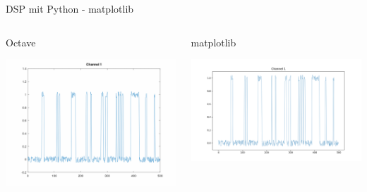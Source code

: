 \documentclass[8pt]{beamer}
\begin{document}
\begin{frame}[label={sec:org7b52c9d}]{DSP mit Python - matplotlib}
\begin{columns}
\begin{column}{0.5\columnwidth}
\begin{block}{Octave}
\begin{center}
\includegraphics[width=.9\linewidth]{./image/vergleich_octave.png}
\end{center}
\end{block}
\end{column}

\begin{column}{0.5\columnwidth}
\begin{block}{matplotlib}
\begin{center}
\includegraphics[width=.9\linewidth]{./image/Vergleich_python.png}
\end{center}
\end{block}
\end{column}
\end{columns}
\end{frame}
\end{document}
